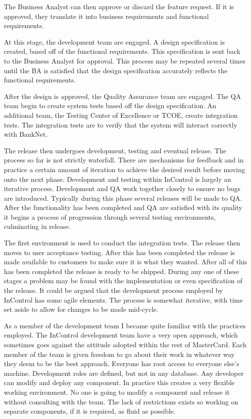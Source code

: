 \documentclass[a4paper, 11pt, titlepage]{article}
\begin{document}
The Business Analyst can then approve or discard the feature request. If it is approved, they translate it into business requirements and functional requirements.

At this stage, the development team are engaged. A design specification is created, based off of the functional requirements. This specification is sent back to the Business Analyst for approval. This process may be repeated several times until the BA is satisfied that the design specification accurately reflects the functional requirements.

After the design is approved, the Quality Assurance team are engaged. The QA team begin to create system tests based off the design specification. An additional team, the Testing Center of Excellence or TCOE, create integration tests. The integration tests are to verify that the system will interact correctly with BankNet.

The release then undergoes development, testing and eventual release. The process so far is not strictly waterfall. There are mechanisms for feedback and in practice a certain amount of iteration to achieve the desired result before moving onto the next phase. Development and testing within InControl is largely an iterative process. Development and QA work together closely to ensure no bugs are introduced. Typically during this phase several releases will be made to QA. After the functionality has been completed and QA are satisfied with its quality it begins a process of progression through several testing environments, culminating in release.

\label{release_environments}
The first environment is used to conduct the integration tests. The release then moves to user acceptance testing. After this has been completed the release is made available to customers to make sure it is what they wanted. After all of this has been completed the release is ready to be shipped. During any one of these stages a problem may be found with the implementation or even specification of the release. It could be argued that the development process employed by InControl has some agile elements. The process is somewhat iterative, with time set aside to allow for changes to be made mid-cycle.

\label{dev}
As a member of the development team I became quite familiar with the practices employed. The InControl development team have a very open approach, which sometimes goes against the attitude adopted within the rest of MasterCard. Each member of the team is given freedom to go about their work in whatever way they deem to be the best approach. Everyone has root access to everyone else's machine. Development roles are defined, but not in any database. Any developer can modify and deploy any component. In practice this creates a very flexible working environment. No one is going to modify a component and release it without consulting with the team. The lack of restrictions exists so working on separate components, if it is required, as fluid as possible. 
\end{document}
